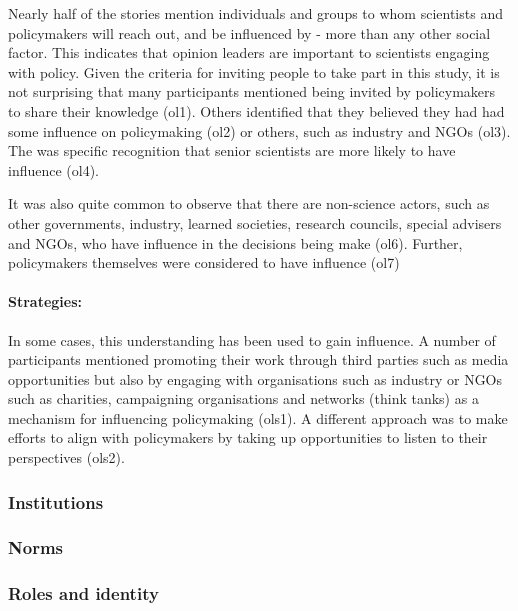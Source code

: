 Nearly half of the stories mention individuals and groups to whom scientists and policymakers will reach out, and be influenced by - more than any other social factor. This indicates that opinion leaders are important to scientists engaging with policy. Given the criteria for inviting people to take part in this study, it is not surprising that many participants mentioned being invited by policymakers to share their knowledge (ol1). Others identified that they believed they had had some influence on policymaking (ol2) or others, such as industry and NGOs (ol3). The was specific recognition that senior scientists are more likely to have influence (ol4).  

It was also quite common to observe that there are non-science actors, such as other governments, industry, learned societies, research councils, special advisers and NGOs, who have influence in the decisions being make (ol6). Further, policymakers themselves were considered to have influence (ol7)

\paragraph{Strategies:}

In some cases, this understanding has been used to gain influence. A number of participants mentioned promoting their work through third parties such as media opportunities but also by engaging with organisations such as industry or NGOs such as charities, campaigning organisations and networks (think tanks) as a mechanism for influencing policymaking (ols1). A different approach was to make efforts to align with policymakers by taking up opportunities to listen to their perspectives (ols2).

\subsubsection{Institutions}\label{sec:resinstitutions}
\subsubsection{Norms}\label{sec:resnorms}

\subsubsection{Roles and identity}\label{sec:resroles}

